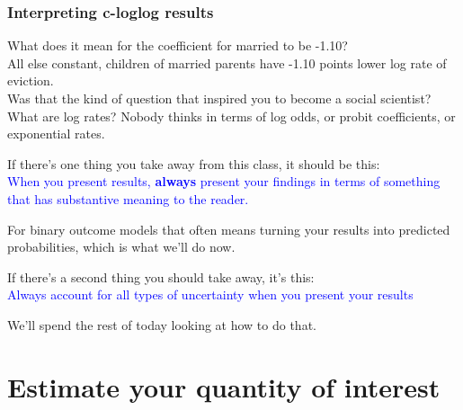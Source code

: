 \documentclass[handout]{beamer}
\begin{document}
\begin{frame}
\frametitle{Interpreting c-loglog results}
What does it mean for the coefficient for married to be -1.10?\\
\pause
\bigskip
All else constant, children of married parents have -1.10 points lower log rate of eviction. \\
\pause
\bigskip
Was that the kind of question that inspired you to become a social scientist?
\pause
What are log rates? \pause
Nobody thinks in terms of log odds, or probit coefficients, or exponential rates.
\end{frame}

\begin{frame}
If there's one thing you take away from this class, it should be this:\\
\pause
\bigskip
\centering \textcolor{blue}{\Large When you present results, {\bf always} present your findings in terms of something that has substantive meaning to the reader.}\\

\bigskip
\pause 
\raggedright For binary outcome models that often means turning your results into predicted probabilities, which is what we'll do now.

\bigskip
\pause
If there's a second thing you should take away, it's this:\\
\pause
\bigskip
\centering \textcolor{blue}{\Large Always account for all types of uncertainty when you present your results}\\

\bigskip
\pause
\raggedright We'll spend the rest of today looking at how to do that.
\end{frame}

\section{Estimate your quantity of interest}
\end{document}
